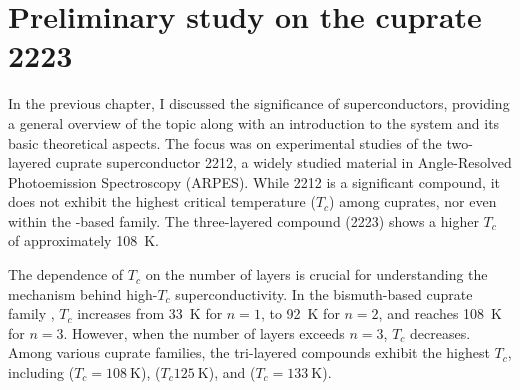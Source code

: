 \chapter{Preliminary study on the cuprate 2223}

In the previous chapter, I discussed the significance of superconductors, providing a general overview of the topic along with an introduction to the system and its basic theoretical aspects.
The focus was on experimental studies of the two-layered cuprate superconductor 2212, a widely studied material in Angle-Resolved Photoemission Spectroscopy (ARPES).
While 2212 is a significant compound, it does not exhibit the highest critical temperature ($T_c$) among cuprates, nor even within the -based family.
The three-layered compound  (2223) shows a higher $T_c$ of approximately \qty{108}{\kelvin}.

The dependence of $T_c$ on the number of  layers is crucial for understanding the mechanism behind high-$T_c$ superconductivity.
In the bismuth-based cuprate family , $T_c$ increases from \qty{33}{\kelvin} for $n=1$, to \qty{92}{\kelvin} for $n=2$, and reaches \qty{108}{\kelvin} for $n=3$.
However, when the number of  layers exceeds $n=3$, $T_c$ decreases.
Among various cuprate families, the tri-layered compounds exhibit the highest $T_c$, including  ($T_c=\qty{108}{\kelvin}$),  ($T_c\qty{125}{\kelvin}$), and  ($T_c=\qty{133}{\kelvin}$).

